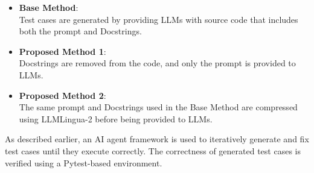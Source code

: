 \begin{itemize}[label={$\bullet$}]
    \item \textbf{Base Method}: \\Test cases are generated by providing LLMs with source code that includes both the prompt and Docstrings.
\vspace{0.2cm}
    \item \textbf{Proposed Method 1}: \\Docstrings are removed from the code, and only the prompt is provided to LLMs.
\vspace{0.2cm}
    \item \textbf{Proposed Method 2}: \\The same prompt and Docstrings used in the Base Method are compressed using LLMLingua-2 before being provided to LLMs.
\end{itemize}

As described earlier, an AI agent framework is used to iteratively generate and fix test cases until they execute correctly. The correctness of generated test cases is verified using a Pytest-based environment.
